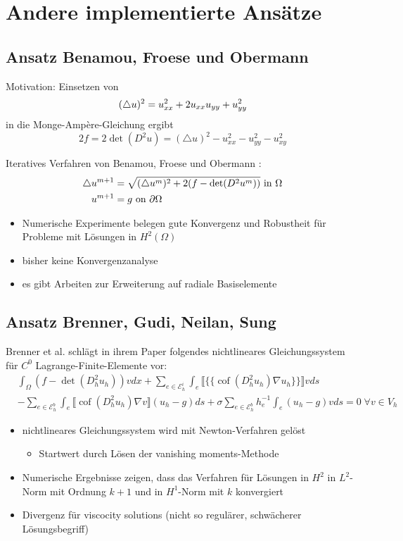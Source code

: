 \documentclass[a4paper,11pt]{article}
\newcommand{\cof}{\operatorname{cof}}
\newcommand{\bigEps}{\mathcal{E}}
\begin{document}
\section*{Andere implementierte Ansätze}

\subsection*{Ansatz Benamou, Froese und Obermann}
Motivation: Einsetzen von  
\[
	(\triangle u)^2= u_{xx}^2 + 2 u_{xx}u_{yy} + u_{yy}^2 \\
\]
in die Monge-Amp\`ere-Gleichung	ergibt
\[
	2f = 2\det(D^2u) = (\triangle u)^2  - u_{xx}^2  - u_{yy}^2  - u_{xy}^2  
\]

Iteratives Verfahren von Benamou, Froese und Obermann \cite{BFO2010}:
\begin{align*}
	\triangle u^{m+1} &= \sqrt{(\triangle{u^{m} })^2 +2 (f - \operatorname{det} (D^2u^m)) }\textnormal{ in } \Omega \\
	u^{m+1} &= g \textnormal{ on } \partial \Omega 
\end{align*}
\begin{itemize}
	\item Numerische Experimente belegen gute Konvergenz und Robustheit für Probleme mit Lösungen in $H^2(\Omega)$
	\item bisher keine Konvergenzanalyse
	\item es gibt Arbeiten zur Erweiterung auf radiale Basiselemente \cite{LH2013}
\end{itemize}

\subsection*{Ansatz Brenner, Gudi, Neilan, Sung}
Brenner et al. schlägt in ihrem Paper \cite{BGN+2011} folgendes nichtlineares Gleichungssystem für $C^0$ Lagrange-Finite-Elemente vor:
\begin{align*}
	&\int_\Omega \left(  f- \det(D^2_h u_h)   \right) v dx
	                     + \sum\limits_{e \in \bigEps_h^i} \int_e \llbracket \{\{\cof(D^2_h u_h) \nabla u_h\}\}  \rrbracket v ds \\
	                     &- \sum\limits_{e \in \bigEps_h^b} \int_e \llbracket \cof(D^2_h u_h) \nabla v \rrbracket (u_h - g) ds 
	                     + \sigma \sum\limits_{e \in \bigEps_h^b} h_e^{-1} \int_e (u_h - g) v ds = 0 \; \forall v \in V_h
\end{align*}

\begin{itemize}
	\item nichtlineares Gleichungssystem wird mit Newton-Verfahren gelöst
	\begin{itemize}
		\item Startwert durch Lösen der vanishing moments-Methode
	\end{itemize}
	\item Numerische Ergebnisse zeigen, dass das Verfahren für Lösungen in $H^2$ in $L^2$-Norm mit Ordnung $k+1$ und in $H^1$-Norm mit $k$ konvergiert
	\item  Divergenz für viscocity solutions (nicht so regulärer, schwächerer Lösungsbegriff)  \cite{FGN2013}
\end{itemize}
\end{document}
